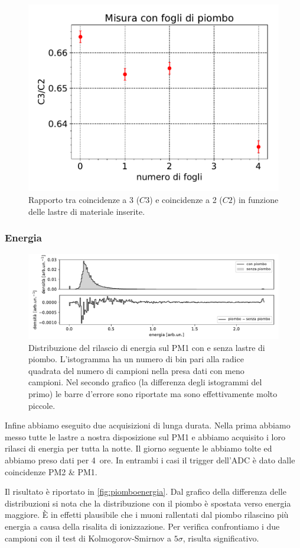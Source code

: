 \begin{figure}[h]
\centering
\includegraphics[width=8 cm]{confronto}
\caption{Rapporto tra coincidenze a 3 ($C3$) e coincidenze a 2 ($C2$) in funzione delle lastre di materiale inserite.}
\label{cfr}
\end{figure}

\subsubsection{Energia}

\begin{figure}
	\hspace{-7.5em}
	\includegraphics[width=1.4\textwidth]{piombo_energia}
	\caption{\label{fig:piomboenergia}
	Distribuzione del rilascio di energia sul PM1 con e senza lastre di piombo.
	L'istogramma ha un numero di bin pari alla radice quadrata del numero di campioni nella presa dati con meno campioni.
	Nel secondo grafico (la differenza degli istogrammi del primo)
	le barre d'errore sono riportate ma sono effettivamente molto piccole.}
\end{figure}

Infine abbiamo eseguito due acquisizioni di lunga durata.
Nella prima abbiamo messo tutte le lastre a nostra disposizione sul PM1
e abbiamo acquisito i loro rilasci di energia per tutta la notte.
Il giorno seguente le abbiamo tolte ed abbiamo preso dati per \SI{4}{ore}.
In entrambi i casi il trigger dell'ADC è dato dalle coincidenze PM2 \& PM1.

Il risultato è riportato in \autoref{fig:piomboenergia}.
Dal grafico della differenza delle distribuzioni
si nota che la distribuzione con il piombo è spostata verso energia maggiore.
È in effetti plausibile che i muoni rallentati dal piombo
rilascino più energia a causa della risalita di ionizzazione.
Per verifica confrontiamo i due campioni con il test di Kolmogorov-Smirnov a $5\sigma$,
risulta significativo.
